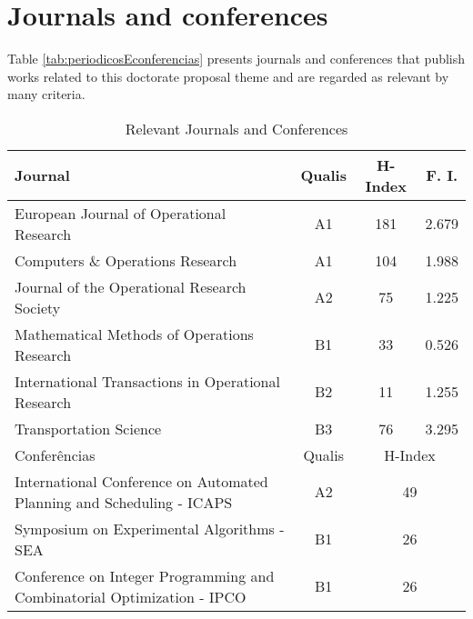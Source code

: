 \documentclass[english,plano-doutorado,twoside]{iiufrgs}
\begin{document}
\section{Journals and conferences}

Table \ref{tab:periodicosEconferencias} presents journals and conferences that publish works related to this doctorate proposal theme and are regarded as relevant by many criteria.

\begin{table}[H]
	\centering
	\caption{Relevant Journals and Conferences}\medskip
	\begin{threeparttable}[b]
	\begin{tabular}{p{}|c|c|c}
	\hline
	Journal & Qualis \tnote{1} & H-Index\tnote{2} & F. I. \tnote{3}\\
	\hline \hline
        European Journal of Operational Research & A1 & 181 & 2.679 \\
        Computers \& Operations Research & A1 & 104 & 1.988\\
	Journal of the Operational Research Society & A2 & 75 & 1.225\\        
        Mathematical Methods of Operations Research & B1 & 33 & 0.526\\
        International Transactions in Operational Research & B2 & 11 & 1.255\\
        Transportation Science & B3 & 76 & 3.295\\
	\hline \hline
        Conferências & Qualis\tnote{1} & \multicolumn{2}{c}{H-Index\tnote{1}} \\
    	\hline \hline
	International Conference on Automated Planning and Scheduling - ICAPS & A2 & \multicolumn{2}{c}{49} \\
	Symposium on Experimental Algorithms - SEA & B1 & \multicolumn{2}{c}{26} \\
	Conference on Integer Programming and Combinatorial Optimization - IPCO & B1 & \multicolumn{2}{c}{26} \\

\end{tabular}
\end{threeparttable}
\end{table}
\end{document}
